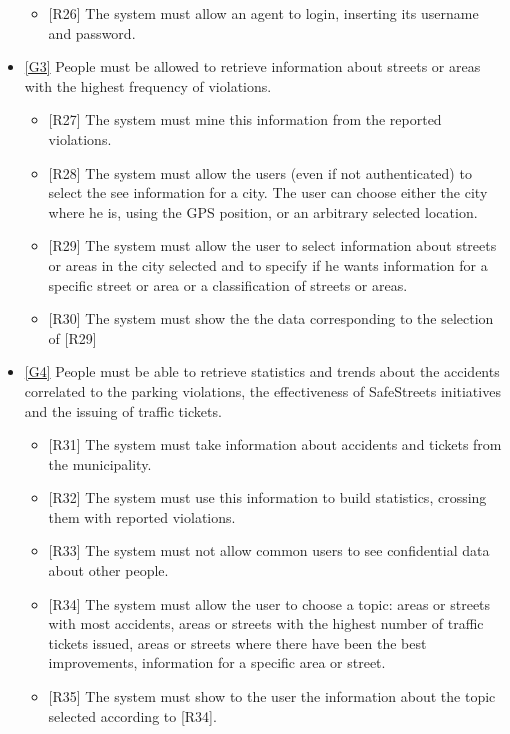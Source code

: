 \documentclass[a4paper]{report}
\begin{document}
\begin{itemize}
\begin{itemize}
\item {[R26]}	\label{R26}The system must allow an agent to login, inserting its username and password.
\end{itemize}
\item  \hyperref[G3]{[G3]} People must be allowed to retrieve information about streets or areas with the highest frequency of violations.
\begin{itemize}
\item {[R27]}	\label{R27}The system must mine this information from the reported violations.
\item {[R28]}	\label{R28}The system must allow the users (even if not authenticated) to select the see information for a city. The user can choose either the city where he is, using the GPS position, or an arbitrary selected location.
\item {[R29]}	\label{R29}The system must allow the user to select information about streets or areas in the city selected and to specify if he wants information for a specific street or area or a classification of streets or areas.
\item {[R30]}	\label{R30}The system must show the the data corresponding to the selection of [R29]
\end{itemize}
\item  \hyperref[G4]{[G4]} People must be able to retrieve statistics and trends about the accidents correlated to the parking violations, the effectiveness of SafeStreets initiatives and the issuing of traffic tickets.
\begin{itemize}
\item {[R31]}	\label{R31}The system must take information about accidents and tickets from the municipality.
\item {[R32]}	\label{R32}The system must use this information to build statistics, crossing them with reported violations.
\item {[R33]}	\label{R33}The system must not allow common users to see confidential data about other people.
\item {[R34]}	\label{R34}The system must allow the user to choose a topic: areas or streets with most accidents, areas or streets with the highest number of traffic tickets issued, areas or streets where there have been the best improvements, information for a specific area or street.
\item {[R35]}	\label{R35}The system must show to the user the information about the topic selected according to [R34].
\end{itemize}

\end{itemize}
\end{document}

